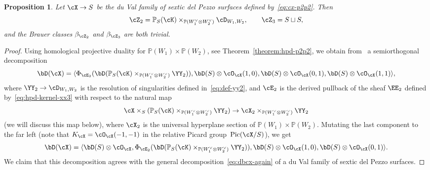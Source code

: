 \documentclass[11pt]{amsart}
\renewcommand{\P}{{\mathbb{P}}}
\DeclareMathOperator{\Pic}{\mathrm{Pic}}
\theoremstyle{plain}
\newtheorem{proposition}[theorem]{Proposition}
\theoremstyle{definition}
\theoremstyle{remark}
\begin{document}
\begin{proposition}
\label{proposition:dp-p2p2}
Let $\cX \to S$ be the du Val family of sextic del Pezzo surfaces defined by~\textup{\eqref{eq:cx-p2p2}}. 
Then 
\begin{equation*}
\cZ_2 = \P_S(\cK) \times_{\P(W_1^\vee \otimes W_2^\vee)} \cD_{W_1,W_2},
\qquad 
\cZ_3 = S \sqcup S,
\end{equation*}
and the Brauer classes $\beta_{\cZ_2}$ and $\beta_{\cZ_3}$ are both trivial.
\end{proposition}
\begin{proof}
Using homological projective duality for $\P(W_1) \times \P(W_2)$, see Theorem~\ref{theorem:hpd-p2p2}, 
we obtain from~\cite[Theorem~6.27]{kuznetsov2007hpd} a semiorthogonal decomposition
\begin{equation*}
\bD(\cX) = \langle \Phi_{\cE_2}(\bD(\P_S(\cK) \times_{\P(W_1^\vee \otimes W_2^\vee)} \YY_2)), \bD(S) \otimes \cO_\cX(1,0), \bD(S) \otimes \cO_\cX(0,1), \bD(S) \otimes \cO_\cX(1,1) \rangle,
\end{equation*}
where $\YY_2 \to \cD_{W_1,W_2}$ is the resolution of singularities defined in~\eqref{eq:def-yy2}, and
$\cE_2$ is the derived pullback of the sheaf $\EE_2$ defined by~\eqref{eq:hpd-kernel-xx3} with respect to the natural map 
\begin{equation}\label{eq:map-cx2}
\cX \times_S (\P_S(\cK) \times_{\P(W_1^\vee \otimes W_2^\vee)} \YY_2) \to \cX_2 \times_{\P(W_1^\vee \otimes W_2^\vee)} \YY_2
\end{equation} 
(we will discuss this map below), where $\cX_2$ is the universal hyperplane section of $\P(W_1) \times \P(W_2)$.
Mutating the last component to the far left (note that $K_\cX = \cO_\cX(-1,-1)$ in the relative Picard group~$\Pic(\cX/S)$), we get
\begin{equation}
\label{eq:sod-cx-p2p2}
\bD(\cX) = \langle \bD(S) \otimes \cO_\cX, \Phi_{\cE_2}(\bD(\P_S(\cK) \times_{\P(W_1^\vee \otimes W_2^\vee)} \YY_2)), \bD(S) \otimes \cO_\cX(1,0), \bD(S) \otimes \cO_\cX(0,1) \rangle.
\end{equation}
We claim that this decomposition agrees with the general decomposition~\eqref{eq:dbcx-again} of a du Val family of sextic del Pezzo surfaces.


\end{proof}
\end{document}
